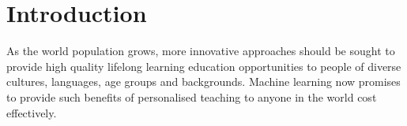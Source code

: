 \documentclass[letterpaper]{article} %
\begin{document}
\begin{abstract}

\end{abstract}

\section{Introduction}
As the world population grows, more innovative approaches should be sought to provide  high quality lifelong learning education opportunities to people of diverse cultures, languages, age groups and backgrounds.
Machine learning now promises to provide such benefits of personalised teaching to anyone in the world cost effectively.
\end{document}
